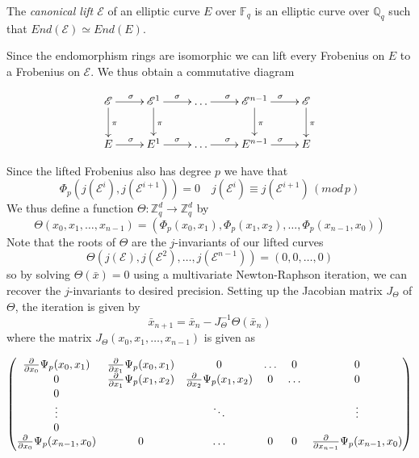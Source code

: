 \begin{mydef}
 The \emph{canonical lift $\mathscr{E}$} of an elliptic curve $E$ over $\mathbb{F}_q$ is
an elliptic curve over $\mathbb{Q}_q$ such that $End(\mathscr{E}) \simeq End(E)$.
\end{mydef}

Since the endomorphism rings are isomorphic we can lift every Frobenius on $E$ to a
Frobenius on $\mathscr{E}$. We thus obtain a commutative diagram

$$
\xymatrix {
  \mathscr{E} \ar[d]^\pi \ar[r]^\sigma & \mathscr{E}^1 \ar[d]^\pi \ar[r]^\sigma & \ldots \ar[r]^\sigma & \mathscr{E}^{n-1} \ar[d]^\pi \ar[r]^\sigma & \mathscr{E} \ar[d]^\pi \\
  E \ar[r]^\sigma & E^1 \ar[r]^\sigma &\ldots \ar[r]^\sigma & E^{n-1} \ar[r]^\sigma & E \\
}
$$

Since the lifted Frobenius also has degree $p$ we have that
$$\Phi_p(j(\mathscr{E}^i), j(\mathscr{E}^{i+1})) = 0 \quad j(\mathscr{E}^i) \equiv j(\mathscr{E}^{i+1}) \, (mod\, p) $$
We thus define a function $\Theta: \mathbb{Z}_q^d \rightarrow \mathbb{Z}_q^d$ by
$$\Theta(x_0, x_1, \ldots, x_{n-1}) = (\Phi_p(x_0, x_1), \Phi_p(x_1, x_2), \ldots, \Phi_p(x_{n-1}, x_0))$$
Note that the roots of $\Theta$ are the $j$-invariants of our lifted curves
$$\Theta(j(\mathscr{E}), j(\mathscr{E}^2), \ldots, j(\mathscr{E}^{n-1})) = (0, 0, \ldots, 0) $$
so by solving $\Theta(\bar{x}) = 0$ using a multivariate Newton-Raphson iteration, we can
recover the $j$-invariants to desired precision. Setting up the Jacobian matrix $J_\Theta$
of $\Theta$, the iteration is given by
$$ \bar{x}_{n+1} = \bar{x}_n - J_\Theta^{-1} \Theta(\bar{x}_n) $$
where the matrix $J_\Theta(x_0, x_1, \ldots, x_{n-1})$ is given as 

$$
\begin{pmatrix}
  {\partial \over \partial x_0} \Psi_p(x_0, x_1) & {\partial \over \partial x_1} \Psi_p(x_0, x_1) & 0 & \ldots & 0 & 0 \\
  0 & {\partial \over \partial x_1} \Psi_p(x_1, x_2) & {\partial \over \partial x_2} \Psi_p(x_1, x_2) & 0 & \ldots & 0 \\
  0 \\
  \vdots & & \ddots & & & \vdots \\
  0 \\
  {\partial \over \partial x_0} \Psi_p(x_{n-1}, x_0) & 0 & \ldots & 0 & 0 & {\partial \over \partial x_{n-1}} \Psi_p(x_{n-1}, x_0) \\
\end{pmatrix}
$$

